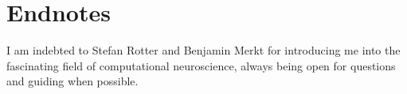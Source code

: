 \chapter{Endnotes}
\label{sec:endnotes}
I am indebted to Stefan Rotter and Benjamin Merkt for introducing 
me into the fascinating field of computational neuroscience, always
being open for questions and guiding when possible. 

